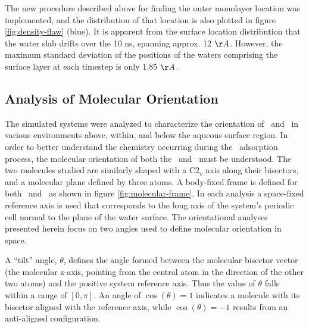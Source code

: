 The new procedure described above for finding the outer monolayer location was implemented, and the distribution of that location is also plotted in figure \ref{fig:density-flaw} (blue). It is apparent from the surface location distribution that the water slab drifts over the 10 ns, spanning approx. 12 $\AA$. However, the maximum standard deviation of the positions of the waters comprising the surface layer at each timestep is only 1.85 $\AA$. 



\subsection{Analysis of Molecular Orientation}

	The simulated systems were analyzed to characterize the orientation of \wat~and \suldiox~in various environments above, within, and below the aqueous surface region. In order to better understand the chemistry occurring during the \suldiox~adsorption process, the molecular orientation of both the \wat~and \suldiox~must be understood.  The two molecules studied are similarly shaped with a C2$_v$ axis along their bisectors, and a molecular plane defined by three atoms. A body-fixed frame is defined for both \wat~and \suldiox~as shown in figure \ref{fig:molecular-frame}. In each analysis a space-fixed reference axis is used that corresponds to the long axis of the system's periodic cell normal to the plane of the water surface. The orientational analyses presented herein focus on two angles used to define molecular orientation in space. 
	
	A ``tilt'' angle, $\theta$, defines the angle formed between the molecular bisector vector (the molecular z-axis, pointing from the central atom in the direction of the other two atoms) and the positive system reference axis. Thus the value of $\theta$ falls within a range of $[0,\pi]$. An angle of $\cos(\theta)=1$ indicates a molecule with its bisector aligned with the reference axis, while $\cos(\theta)=-1$ results from an anti-aligned configuration. 
	
